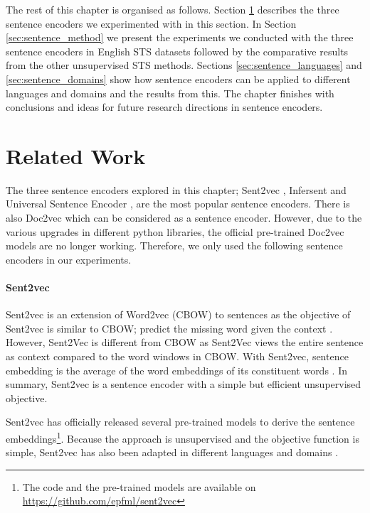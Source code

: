 The rest of this chapter is organised as follows. Section \ref{sec:sentence_related} describes the three sentence encoders we experimented with in this section. In Section \ref{sec:sentence_method} we present the experiments we conducted with the three sentence encoders in English STS datasets followed by the comparative results from the other unsupervised STS methods. Sections \ref{sec:sentence_languages} and \ref{sec:sentence_domains} show how sentence encoders can be applied to different languages and domains and the results from this. The chapter finishes with conclusions and ideas for future research directions in sentence encoders.


\section{Related Work}
\label{sec:sentence_related}
The three sentence encoders explored in this chapter; Sent2vec \autocite{pagliardini-etal-2018-unsupervised}, Infersent \autocite{conneau-EtAl:2017:EMNLP2017} and Universal Sentence Encoder \autocite{cer2018universal}, are the most popular sentence encoders. There is also Doc2vec \autocite{pmlr-v32-le14} which can be considered as a sentence encoder. However, due to the various upgrades in different python libraries, the official pre-trained Doc2vec models are no longer working. Therefore, we only used the following sentence encoders in our experiments.

\paragraph{Sent2vec}
Sent2vec is an extension of Word2vec (CBOW) to sentences as the objective of Sent2vec is similar to CBOW; predict the missing word given the context \autocite{pagliardini-etal-2018-unsupervised}. However, Sent2Vec is different from CBOW as Sent2Vec views the entire sentence as context compared to the word windows in CBOW. With Sent2vec, sentence embedding is the average of the word embeddings of its constituent words \autocite{pagliardini-etal-2018-unsupervised}. In summary, Sent2vec is a sentence encoder with a simple but efficient unsupervised objective.

Sent2vec has officially released several pre-trained models to derive the sentence embeddings\footnote{The code and the pre-trained models are available on \url{https://github.com/epfml/sent2vec}}. Because the approach is unsupervised and the objective function is simple, Sent2vec has also been adapted in different languages and domains \autocite{Heo2021, zhu-etal-2018-exploring, Allot2019}.  


